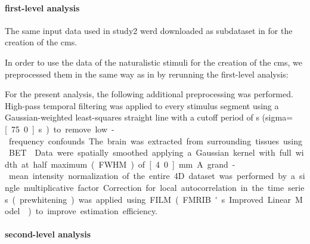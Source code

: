 \paragraph{first-level analysis}


The same input data used in study2 werd downloaded as subdataset in
\citep{haeusler2021ppadata} for the creation of the \ac{cms}.

%
In order to use the data of the naturalistic stimuli for the creation of the
\ac{cms}, we preprocessed them in the same way as in
\citep{haeusler2022processing} by rerunning the first-level analysis:


For the present analysis, the following additional preprocessing was performed.
High-pass temporal filtering was applied to every stimulus segment using a
Gaussian-weighted least-squares straight line with a cutoff period of
\unit[150]{s} (sigma=\unit[75.0]{s}) to remove low-frequency confounds.
The brain was extracted from surrounding tissues using BET \citep{smith2002bet}.
Data were spatially smoothed applying a Gaussian kernel with full width at half
maximum (FWHM) of \unit[4.0]{mm}.
A grand-mean intensity normalization of the entire 4D dataset was performed by a
single multiplicative factor.
Correction for local autocorrelation in the time series (prewhitening) was
applied using FILM (FMRIB's Improved Linear Model \citep{woolrich2001autocorr})
to improve estimation efficiency.


\paragraph{second-level analysis}


